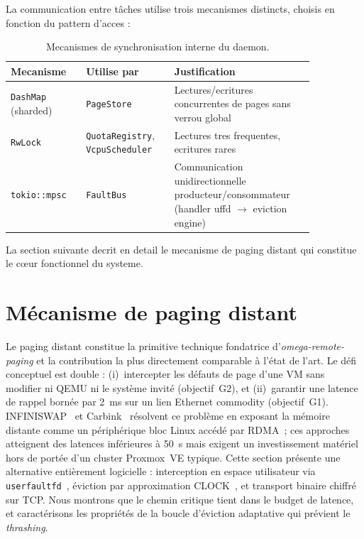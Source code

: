 La communication entre t\^aches utilise trois mecanismes distincts, choisis en fonction du pattern d'acces :

\begin{table}[htbp]
    \centering
    \caption{Mecanismes de synchronisation interne du daemon.}
    \label{tab:sync-mecanismes}
    \begin{tabular}{p{0.22\linewidth} p{0.25\linewidth} p{0.38\linewidth}}
        \toprule
        \textbf{Mecanisme} & \textbf{Utilise par} & \textbf{Justification} \\
        \midrule
        \texttt{DashMap} (sharded) & \texttt{PageStore} & Lectures/ecritures concurrentes de pages sans verrou global \\
        \texttt{RwLock} & \texttt{QuotaRegistry}, \texttt{VcpuScheduler} & Lectures tres frequentes, ecritures rares \\
        \texttt{tokio::mpsc} & \texttt{FaultBus} & Communication unidirectionnelle producteur/consommateur (handler uffd $\to$ eviction engine) \\
        \bottomrule
    \end{tabular}
\end{table}

La section suivante decrit en detail le mecanisme de paging distant qui constitue le c\oe{}ur fonctionnel du systeme.

\section{Mécanisme de paging distant}
\label{sec:paging-distant}

Le paging distant constitue la primitive technique fondatrice d'\textit{omega-remote-paging} et la contribution la plus directement comparable à l'état de l'art. Le défi conceptuel est double : (i)~intercepter les défauts de page d'une VM sans modifier ni QEMU ni le système invité (objectif~G2), et (ii)~garantir une latence de rappel bornée par 2~ms sur un lien Ethernet commodity (objectif~G1). INFINISWAP~\cite{gu_2017_infiniswap} et Carbink~\cite{zhou_2022_carbink} résolvent ce problème en exposant la mémoire distante comme un périphérique bloc Linux accédé par RDMA~; ces approches atteignent des latences inférieures à 50~\textmu{}s mais exigent un investissement matériel hors de portée d'un cluster Proxmox~VE typique. Cette section présente une alternative entièrement logicielle : interception en espace utilisateur via \texttt{userfaultfd}~\cite{userfaultfd_man}, éviction par approximation CLOCK~\cite{tanenbaum_os,jiang_2005_clockpro}, et transport binaire chiffré sur TCP. Nous montrons que le chemin critique tient dans le budget de latence, et caractérisons les propriétés de la boucle d'éviction adaptative qui prévient le \textit{thrashing}.

